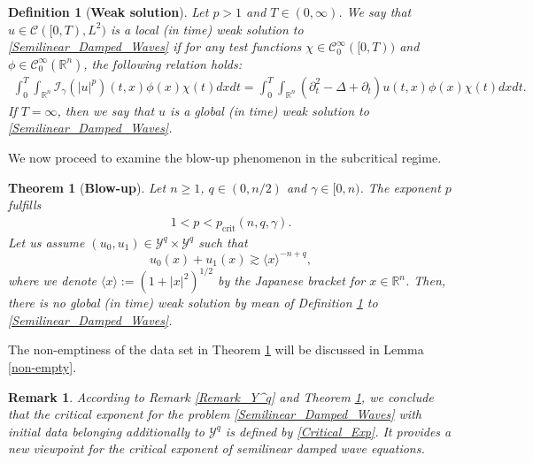 \documentclass[11pt,reqno]{amsart}
\newtheorem{definition}{Definition}[section]
\newtheorem{theorem}{Theorem}[section]
\newtheorem{remark}{Remark}[section]
\begin{document}
\begin{definition}[\textbf{Weak solution}] \label{weak_def}
Let $p > 1$ and $T \in (0, \infty)$. We say that $u \in \mathcal{C}([0,T), L^2)$ is a local (in time) weak solution to \eqref{Semilinear_Damped_Waves} if  for any test functions $\chi \in \mathcal{C}_0^\infty([0,T))$ and $\phi \in \mathcal{C}_0^{\infty}(\mathbb{R}^n)$,  the following relation holds: 
\begin{align}
\int_0^{T}\int_{ \mathbb{R}^n}\mathcal{I}_{\gamma} (|u|^p)(t,x)\phi(x)\chi(t)dxdt = \int_0^{T}\int_{ \mathbb{R}^n}(\partial_t^2-\Delta+\partial_t)u(t,x)\phi(x)\chi(t)dxdt. \label{eqweak}
\end{align}
If $T = \infty$, then we say that $u$ is a global (in time) weak solution to \eqref{Semilinear_Damped_Waves}.
\end{definition}
We now proceed to examine the blow-up phenomenon in the subcritical regime.
\begin{theorem}[\textbf{Blow-up}] \label{Thm_Blow_up}
Let $n \geq 1$, $q \in (0, n/2)$ and $\gamma\in [0,n)$. The exponent $p$ fulfills
\begin{align}
1<p<p_{\mathrm{crit}}(n, q, \gamma). \label{condition-Blowup}
\end{align}
Let us assume $\left(u_0,u_1\right)\in \mathcal{Y}^q\times\mathcal{Y}^q$ such that
\begin{equation} \label{assumption_initial_data}
u_0(x)+u_1(x)\gtrsim\langle x\rangle^{-n+q},
\end{equation}
where we denote $\langle x\rangle:= \left(1+|x|^2\right)^{1/2}$ by the Japanese bracket for $x \in \mathbb{R}^n$. Then, there is no global (in time) weak solution by mean of Definition \ref{weak_def} to \eqref{Semilinear_Damped_Waves}.
\end{theorem}
The non-emptiness of the data set in Theorem \ref{Thm_Blow_up} will be discussed in Lemma \ref{non-empty}.
\begin{remark}
\selectfont
According to Remark \ref{Remark_Y^q} and Theorem \ref{Thm_Blow_up}, we conclude that the critical exponent for the problem \eqref{Semilinear_Damped_Waves} with initial data belonging additionally to $\mathcal{Y}^q$ is defined by  \eqref{Critical_Exp}. It provides a new viewpoint for the critical exponent of semilinear damped wave equations. 
\end{remark}
\end{document}
